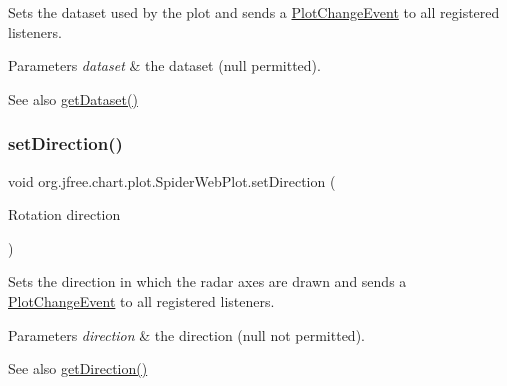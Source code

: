 Sets the dataset used by the plot and sends a \mbox{\hyperlink{}{Plot\+Change\+Event}} to all registered listeners.


\begin{DoxyParams}{Parameters}
{\em dataset} & the dataset ({\ttfamily null} permitted).\\
\hline
\end{DoxyParams}
\begin{DoxySeeAlso}{See also}
\mbox{\hyperlink{classorg_1_1jfree_1_1chart_1_1plot_1_1_spider_web_plot_ad7f61479dddf8cce633d3192d37e732e}{get\+Dataset()}} 
\end{DoxySeeAlso}
\mbox{\label{classorg_1_1jfree_1_1chart_1_1plot_1_1_spider_web_plot_a298f02b4355b79c7961dbdab899323d9}} 
\subsubsection{\texorpdfstring{set\+Direction()}{setDirection()}}
{\footnotesize\ttfamily void org.\+jfree.\+chart.\+plot.\+Spider\+Web\+Plot.\+set\+Direction (\begin{DoxyParamCaption}\item[{Rotation}]{direction }\end{DoxyParamCaption})}

Sets the direction in which the radar axes are drawn and sends a \mbox{\hyperlink{}{Plot\+Change\+Event}} to all registered listeners.


\begin{DoxyParams}{Parameters}
{\em direction} & the direction ({\ttfamily null} not permitted).\\
\hline
\end{DoxyParams}
\begin{DoxySeeAlso}{See also}
\mbox{\hyperlink{classorg_1_1jfree_1_1chart_1_1plot_1_1_spider_web_plot_ac4d6cdf78a5f822b4f2a0a8ccca8a3f4}{get\+Direction()}} 
\end{DoxySeeAlso}
\mbox{\label{classorg_1_1jfree_1_1chart_1_1plot_1_1_spider_web_plot_a747ddb161e3cd2dffee8a0e87737767e}} 
